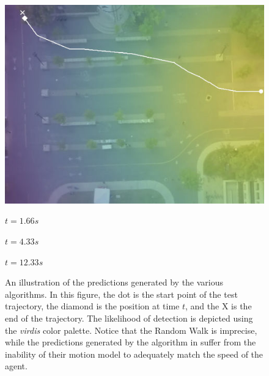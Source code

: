 \documentclass[letterpaper,10pt,conference]{ieeeconf}
\begin{document}
\begin{figure}
\begin{minipage}[c]{0.3\linewidth}
		\includegraphics[width=\linewidth]{./figures/bookstore/rand_1_2_t=370.jpg}
	\end{minipage}
	
	\vspace{0.2cm}
	\hspace{.5cm}
	\begin{minipage}{0.3\linewidth}
		\centering
		$t = 1.66s$
	\end{minipage}
	\begin{minipage}{0.3\linewidth}
		\centering
		$t = 4.33s$
	\end{minipage}
	\begin{minipage}{0.3\linewidth}
		\centering
		$t = 12.33s$
	\end{minipage}
	
	\caption{An illustration of the predictions generated by the various algorithms. In this figure, the dot is the start point of the test trajectory, the diamond is the position at time $t$, and the X is the end of the trajectory. The likelihood of detection is depicted using the \textit{virdis} color palette. Notice that the Random Walk is imprecise, while the predictions generated by the algorithm in \cite{Kitani2012} suffer from the inability of their motion model to adequately match the speed of the agent.}
	
	\label{fig:bookstore-1-2}
\end{figure}
\end{document}

